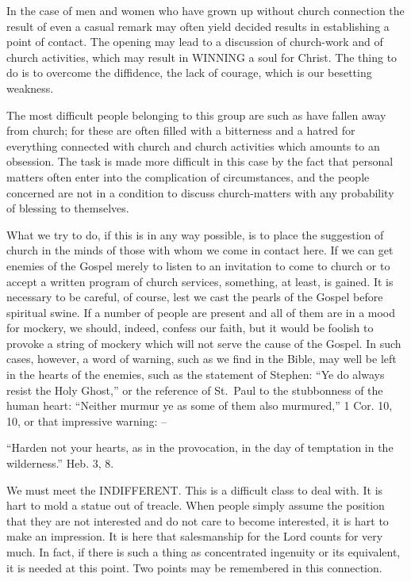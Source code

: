 \documentclass[
]{book}
\begin{document}
In the case of men and women who have grown up without church connection the result of even a casual remark may often yield decided results in establishing a point of contact. The opening may lead to a discussion of church-work and of church activities, which may result in WINNING a soul for Christ. The thing to do is to overcome the diffidence, the lack of courage, which is our besetting weakness.

The most difficult people belonging to this group are such as have fallen away from church; for these are often filled with a bitterness and a hatred for everything connected with church and church activities which amounts to an obsession. The task is made more difficult in this case by the fact that personal matters often enter into the complication of circumstances, and the people concerned are not in a condition to discuss church-matters with any probability of blessing to themselves.

What we try to do, if this is in any way possible, is to place the suggestion of church in the minds of those with whom we come in contact here. If we can get enemies of the Gospel merely to listen to an invitation to come to church or to accept a written program of church services, something, at least, is gained. It is necessary to be careful, of course, lest we cast the pearls of the Gospel before spiritual swine. If a number of people are present and all of them are in a mood for mockery, we should, indeed, confess our faith, but it would be foolish to provoke a string of mockery which will not serve the cause of the Gospel. In such cases, however, a word of warning, such as we find in the Bible, may well be left in the hearts of the enemies, such as the statement of Stephen: ``Ye do always resist the Holy Ghost,'' or the reference of St.~Paul to the stubbonness of the human heart: ``Neither murmur ye as some of them also murmured,'' 1 Cor. 10, 10, or that impressive warning: --

``Harden not your hearts, as in the provocation, in the day of temptation in the wilderness.'' Heb. 3, 8.

We must meet the INDIFFERENT. This is a difficult class to deal with. It is hart to mold a statue out of treacle. When people simply assume the position that they are not interested and do not care to become interested, it is hart to make an impression. It is here that salesmanship for the Lord counts for very much. In fact, if there is such a thing as concentrated ingenuity or its equivalent, it is needed at this point. Two points may be remembered in this connection.
\end{document}
